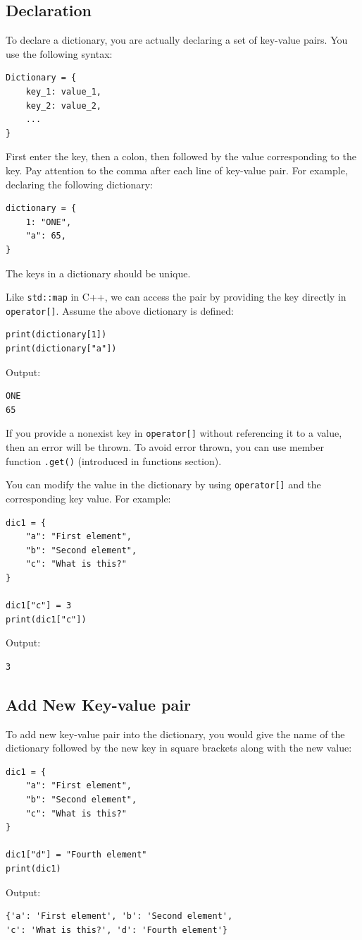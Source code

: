 \documentclass[12pt]{book}
\begin{document}
\subsection{Declaration}
\label{sec:org6583027}
To declare a dictionary, you are actually declaring a set of key-value pairs. You use the following syntax:
\begin{verbatim}
Dictionary = {
    key_1: value_1,
    key_2: value_2,
    ...
}
\end{verbatim}
First enter the key, then a colon, then followed by the value corresponding to the key. Pay attention to the comma after each line of key-value pair. For example, declaring the following dictionary:
\begin{verbatim}
dictionary = {
    1: "ONE",
    "a": 65,
}
\end{verbatim}
The keys in a dictionary should be unique.

Like \texttt{std::map} in C++, we can access the pair by providing the key directly in \texttt{operator[]}. Assume the above dictionary is defined:
\begin{verbatim}
print(dictionary[1])
print(dictionary["a"])
\end{verbatim}
Output:
\begin{verbatim}
ONE
65
\end{verbatim}
If you provide a nonexist key in \texttt{operator[]} without referencing it to a value, then an error will be thrown. To avoid error thrown, you can use member function \texttt{.get()} (introduced in functions section).

You can modify the value in the dictionary by using \texttt{operator[]} and the corresponding key value. For example:
\begin{verbatim}
dic1 = {
    "a": "First element",
    "b": "Second element",
    "c": "What is this?"
}

dic1["c"] = 3
print(dic1["c"])
\end{verbatim}
Output:
\begin{verbatim}
3
\end{verbatim}
\subsection{Add New Key-value pair}
\label{sec:org8c16cd2}
To add new key-value pair into the dictionary, you would give the name of the dictionary followed by the new key in square brackets along with the new value:
\begin{verbatim}
dic1 = {
    "a": "First element",
    "b": "Second element",
    "c": "What is this?"
}

dic1["d"] = "Fourth element"
print(dic1)

\end{verbatim}
Output:
\begin{verbatim}
{'a': 'First element', 'b': 'Second element',
'c': 'What is this?', 'd': 'Fourth element'}
\end{verbatim}
\end{document}
